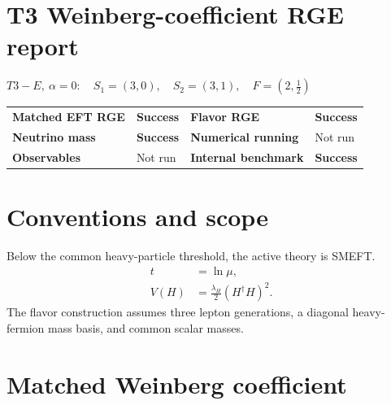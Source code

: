 \documentclass[10pt]{article}
\begin{document}
\section*{T3 Weinberg-coefficient RGE report}
\noindent $T3-E,\ \alpha=0:\quad S_1=(3,0),\quad S_2=(3,1),\quad F=(2,\frac{1}{2})$
\par\medskip
\begin{center}
\begin{tabular}{>{\bfseries}l l >{\bfseries}l l}
\toprule
Matched EFT RGE & \textcolor{green!45!black}{\textbf{Success}} & Flavor RGE & \textcolor{green!45!black}{\textbf{Success}} \\
Neutrino mass & \textcolor{green!45!black}{\textbf{Success}} & Numerical running & \textcolor{black!55}{Not run} \\
Observables & \textcolor{black!55}{Not run} & Internal benchmark & \textcolor{green!45!black}{\textbf{Success}} \\
\bottomrule
\end{tabular}
\end{center}
\section{Conventions and scope}
Below the common heavy-particle threshold, the active theory is SMEFT.
\begin{align*}
t&=\ln\mu,\\
V(H)&=\frac{\lambda_H}{2}(H^\dagger H)^2.
\end{align*}
The flavor construction assumes three lepton generations, a diagonal heavy-fermion mass basis, and common scalar masses.
\section{Matched Weinberg coefficient}
\noindent{}\par
\smallskip
\end{document}
